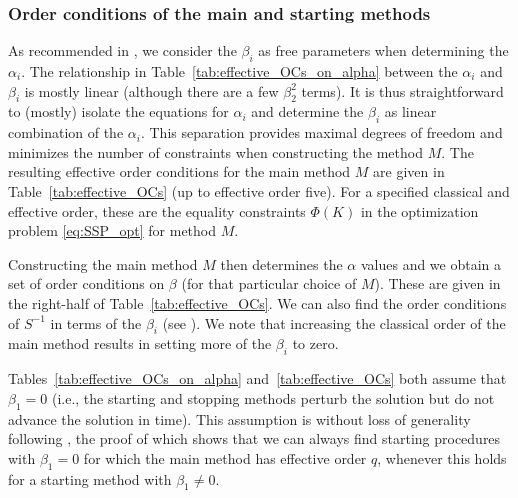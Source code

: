 \subsubsection{Order conditions of the main and starting methods}\label{subsubsec:Main_starting_conditions}
As recommended in \cite{Butcher2008_book},
we consider the $\beta_{i}$ as free
parameters when determining the $\alpha_i$.
The relationship in Table~\ref{tab:effective_OCs_on_alpha} between the
$\alpha_i$ and $\beta_i$ is mostly linear (although there are a few
$\beta_2^2$ terms).
It is thus straightforward to (mostly) isolate the equations for $\alpha_i$
and determine the $\beta_i$ as linear combination of the $\alpha_i$.
This separation provides maximal degrees of freedom and minimizes the number of
constraints when constructing the method $M$.
The resulting effective order conditions for the main method $M$ are given
in Table~\ref{tab:effective_OCs} (up to effective order five).
For a specified classical and effective order, these are the equality constraints
$\Phi(K)$ in the optimization problem \eqref{eq:SSP_opt} for method $M$.

Constructing the main method $M$ then determines the $\alpha$ values
and we obtain a set of order conditions on $\beta$ (for that
particular choice of $M$).  These are given in the right-half of
Table~\ref{tab:effective_OCs}.
We can also find the order conditions of $S^{-1}$ in terms of the
$\beta_i$ (see \cite[Table~386(III)]{Butcher2008_book}).
We note that increasing the classical order of the main method results
in setting more of the $\beta_i$ to zero.

Tables~\ref{tab:effective_OCs_on_alpha} and~\ref{tab:effective_OCs}
both assume that $\beta_1=0$ (i.e., the starting and stopping methods
perturb the solution but do not advance the solution in time).  This
assumption is without loss of generality following \cite[Lemma
389A]{Butcher2008_book}, the proof of which shows that we can always find 
starting procedures with $\beta_1 = 0$ for which the main method has 
effective order $q$, whenever this holds for a starting method with 
$\beta_1 \neq 0$.


